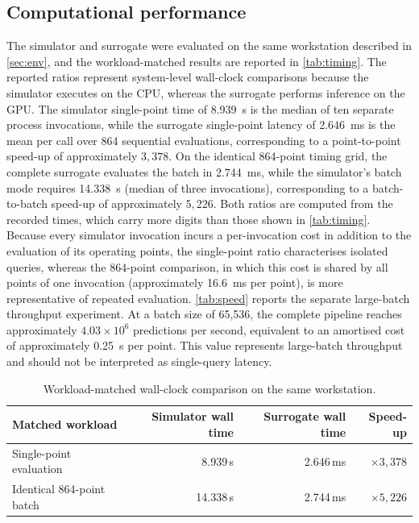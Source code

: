 \documentclass[final,5p,times,twocolumn,numbers]{elsarticle}
\begin{document}
\subsection{Computational performance}\label{sec:speed}
The simulator and surrogate were evaluated on the same workstation described in \autoref{sec:env}, and the workload-matched results are reported in \autoref{tab:timing}. The reported ratios represent system-level wall-clock comparisons because the simulator executes on the CPU, whereas the surrogate performs inference on the GPU. The simulator single-point time of 8.939~s is the median of ten separate process invocations, while the surrogate single-point latency of 2.646~ms is the mean per call over 864 sequential evaluations, corresponding to a point-to-point speed-up of approximately $3{,}378$. On the identical 864-point timing grid, the complete surrogate evaluates the batch in 2.744~ms, while the simulator's batch mode requires 14.338~s (median of three invocations), corresponding to a batch-to-batch speed-up of approximately $5{,}226$. Both ratios are computed from the recorded times, which carry more digits than those shown in \autoref{tab:timing}. Because every simulator invocation incurs a per-invocation cost in addition to the evaluation of its operating points, the single-point ratio characterises isolated queries, whereas the 864-point comparison, in which this cost is shared by all points of one invocation (approximately 16.6~ms per point), is more representative of repeated evaluation. \autoref{tab:speed} reports the separate large-batch throughput experiment. At a batch size of 65{,}536, the complete pipeline reaches approximately $4.03\times10^6$ predictions per second, equivalent to an amortised cost of approximately 0.25~\textmu s per point. This value represents large-batch throughput and should not be interpreted as single-query latency.
\begin{table}[ht]
\centering
\caption{Workload-matched wall-clock comparison on the same workstation.}
\label{tab:timing}
\begin{tabular}{lrrr}
\hline
Matched workload & Simulator wall time & Surrogate wall time & Speed-up \\
\hline
Single-point evaluation & 8.939\,s & 2.646\,ms & $\times3{,}378$ \\
Identical 864-point batch & 14.338\,s & 2.744\,ms & $\times5{,}226$ \\
\hline
\end{tabular}
\end{table}
\end{document}
